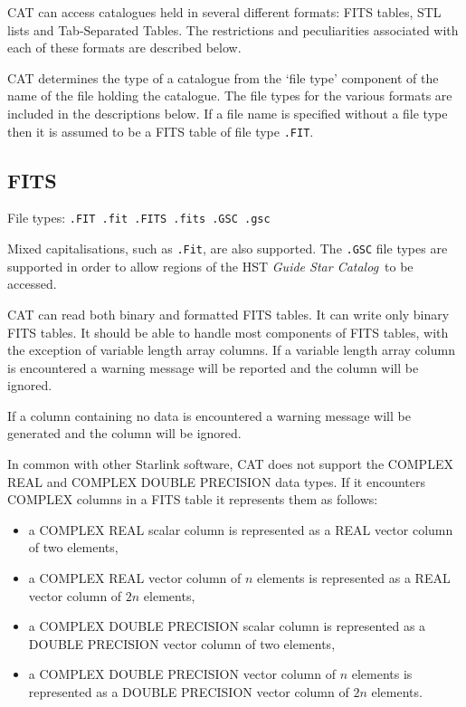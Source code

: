 \documentclass[11pt,twoside]{starlink}
\begin{document}
CAT can access catalogues held in several different formats: FITS tables,
STL lists and Tab-Separated Tables.  The restrictions and peculiarities
associated with each of these formats are described below.

CAT determines the type of a catalogue from the `file type' component
of the name of the file holding the catalogue. The file types for the
various formats are included in the descriptions below. If a file name
is specified without a file type then it is assumed to be a FITS table
of file type \texttt{.FIT}.


\subsection{FITS}

File types: \texttt{.FIT  .fit  .FITS  .fits  .GSC  .gsc}

Mixed capitalisations, such as \texttt{.Fit}, are also supported.  The \texttt{.GSC} file types are supported in order to allow regions of the HST \textit{Guide Star Catalog}\, to be accessed.

CAT can read both binary and formatted FITS tables. It can write only
binary FITS tables. It should be able to handle most components of
FITS tables, with the exception of variable length array columns. If
a variable length array column is encountered a warning message will
be reported and the column will be ignored.

If a column containing no data is encountered a warning message will be
generated and the column will be ignored.

In common with other Starlink software, CAT does not support the
COMPLEX REAL and COMPLEX DOUBLE PRECISION data types. If it encounters
COMPLEX columns in a FITS table it represents them as follows:

\begin{itemize}

  \item a COMPLEX REAL scalar column is represented as a REAL vector
   column of two elements,

  \item a COMPLEX REAL vector column of $n$ elements is represented as
   a REAL vector column of $2n$ elements,

  \item a COMPLEX DOUBLE PRECISION scalar column is represented as a
   DOUBLE PRECISION vector column of two elements,

  \item a COMPLEX DOUBLE PRECISION vector column of $n$ elements is
   represented as a DOUBLE PRECISION vector column of $2n$ elements.

\end{itemize}
\end{document}
